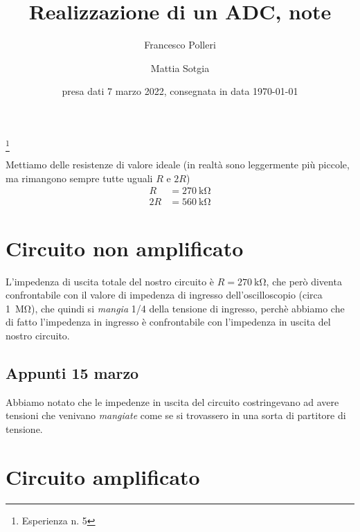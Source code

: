 \documentclass[
    rmp,
    reprint, 
    superscriptaddress, 
    altaffilletter, 
    amsmath, 
    amssymb, 
    a4paper,
    fleqn]{revtex4-2}
\begin{document}
\title{
    Realizzazione di un ADC, note
}
\thanks{Esperienza n. 5
}

\author{Francesco Polleri}
\author{Mattia Sotgia}


\date{presa dati
    7 marzo 2022, consegnata in data 
    \today
}

\begin{abstract}

\end{abstract}
\maketitle
\thispagestyle{fancy}


Mettiamo delle resistenze di valore ideale (in realtà sono leggermente più piccole, ma rimangono sempre tutte uguali $R$ e $2R$) \begin{align*}
    R &= \SI{270}{\kilo\ohm}\\
    2R &= \SI{560}{\kilo\ohm}
\end{align*}
    
\section{Circuito non amplificato}
L'impedenza di uscita totale del nostro circuito è $R = \SI{270}{\kilo\ohm}$, che però diventa confrontabile con il valore di impedenza di ingresso dell'oscilloscopio (circa \SI[]{1}[]{\mega\ohm}), che quindi si \emph{mangia} 1/4 della tensione di ingresso, perchè abbiamo che di fatto l'impedenza in ingresso è confrontabile con l'impedenza in uscita del nostro circuito.

\subsection{Appunti 15 marzo}
Abbiamo notato che le impedenze in uscita del circuito costringevano ad avere tensioni che venivano \emph{mangiate} come se si trovassero in una sorta di partitore di tensione.

\section{Circuito amplificato}
\end{document}

